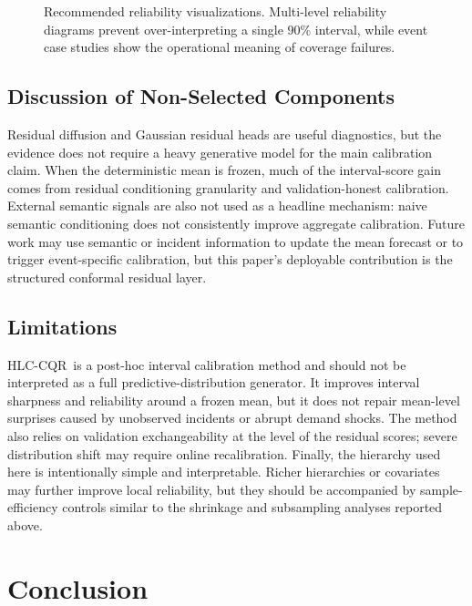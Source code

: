 \documentclass[letterpaper,journal]{IEEEtran}
\newcommand{\hlc}{HLC-CQR}
\begin{document}
\begin{figure}[t]
\centering
{}
\caption{Recommended reliability visualizations. Multi-level reliability diagrams prevent over-interpreting a single 90\% interval, while event case studies show the operational meaning of coverage failures.}
\label{fig:reliability_case}
\end{figure}

\subsection{Discussion of Non-Selected Components}
Residual diffusion and Gaussian residual heads are useful diagnostics, but the evidence does not require a heavy generative model for the main calibration claim. When the deterministic mean is frozen, much of the interval-score gain comes from residual conditioning granularity and validation-honest calibration. External semantic signals are also not used as a headline mechanism: naive semantic conditioning does not consistently improve aggregate calibration. Future work may use semantic or incident information to update the mean forecast or to trigger event-specific calibration, but this paper's deployable contribution is the structured conformal residual layer.

\subsection{Limitations}
\hlc\ is a post-hoc interval calibration method and should not be interpreted as a full predictive-distribution generator. It improves interval sharpness and reliability around a frozen mean, but it does not repair mean-level surprises caused by unobserved incidents or abrupt demand shocks. The method also relies on validation exchangeability at the level of the residual scores; severe distribution shift may require online recalibration. Finally, the hierarchy used here is intentionally simple and interpretable. Richer hierarchies or covariates may further improve local reliability, but they should be accompanied by sample-efficiency controls similar to the shrinkage and subsampling analyses reported above.

\section{Conclusion}
\end{document}
